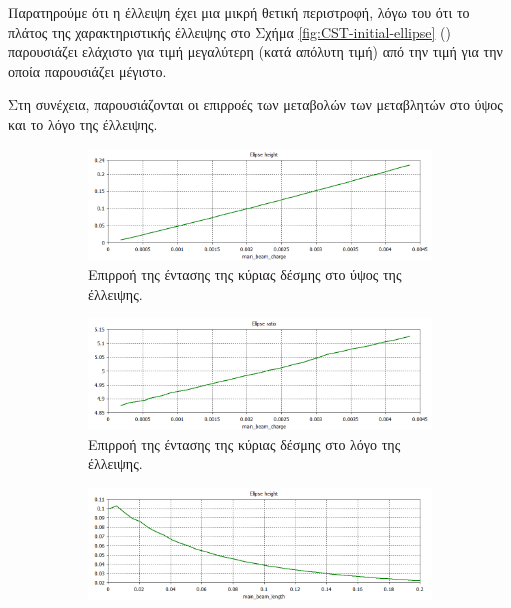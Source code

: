 Παρατηρούμε ότι η έλλειψη έχει μια μικρή θετική περιστροφή, λόγω του ότι το πλάτος της χαρακτηριστικής έλλειψης στο Σχήμα \ref{fig:CST-initial-ellipse} () παρουσιάζει ελάχιστο για τιμή μεγαλύτερη (κατά απόλυτη τιμή) από την τιμή για την οποία παρουσιάζει μέγιστο.

Στη συνέχεια, παρουσιάζονται οι επιρροές των μεταβολών των μεταβλητών στο ύψος και το λόγο της έλλειψης.

\begin{figure}[tph]	
	\centering
	\begin{subfigure}{0.47\textwidth}
		\includegraphics[width=\linewidth]{figures/CST-variable-analysis/CST-ellipse-height-by-bunch-intensity}
		\centering
		\caption{Επιρροή της έντασης της κύριας δέσμης στο ύψος της έλλειψης.}
		\label{fig:CST-ellipse-height-by-bunch-intensity}
	\end{subfigure}
	\hfill
	\begin{subfigure}{0.47\textwidth}
		\includegraphics[width=\linewidth]{figures/CST-variable-analysis/CST-ellipse-ratio-by-bunch-intensity}
		\centering
		\caption{Επιρροή της έντασης της κύριας δέσμης στο λόγο της έλλειψης.}
		\label{fig:CST-ellipse-ratio-by-bunch-intensity}
	\end{subfigure}	
	\par\bigskip	
	\begin{subfigure}{0.47\textwidth}
		\includegraphics[width=\linewidth]{figures/CST-variable-analysis/CST-ellipse-height-by-bunch-length}

\end{subfigure}
\end{figure}
